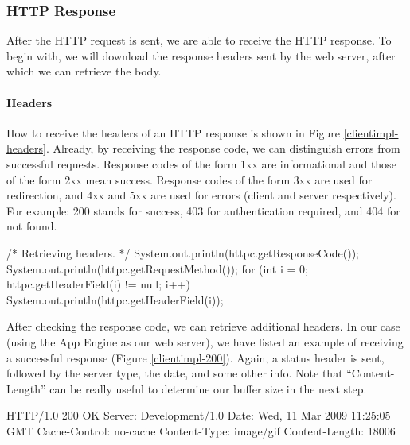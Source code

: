 \subsubsection{HTTP Response}
After the HTTP request is sent, we are able to receive the HTTP response. To
begin with, we will download the response headers sent by the web server, after
which we can retrieve the body.

\paragraph{Headers}
How to receive the headers of an HTTP response is shown in Figure
\ref{clientimpl-headers}. Already, by receiving the response code, we can
distinguish errors from successful requests. Response codes of the form 1xx
are informational and those of the form 2xx mean success. Response codes
of the form 3xx are used for redirection, and 4xx and 5xx are used for
errors (client and server respectively). For example: 200 stands for success, 403 for
authentication required, and 404 for not found.

\begin{figure*}[ht] %
\begin{center}
\begin{code}
/* Retrieving headers. */
System.out.println(httpc.getResponseCode());
System.out.println(httpc.getRequestMethod());
for (int i = 0; httpc.getHeaderField(i) != null; i++) {
    System.out.println(httpc.getHeaderField(i));
}
\end{code}
\caption{Retrieving HTTP response headers.\label{clientimpl-headers}}
\end{center}
\end{figure*}

After checking the response code, we can retrieve additional headers. In our case
(using the App Engine as our web server), we have listed an example of receiving
a successful response (Figure \ref{clientimpl-200}). Again, a status header is
sent, followed by the server type, the date, and some other info. Note that
``Content-Length'' can be really useful to determine our buffer size in the next
step.

\begin{figure*}[ht] %
\begin{center}
\begin{code}
HTTP/1.0 200 OK
Server: Development/1.0
Date: Wed, 11 Mar 2009 11:25:05 GMT
Cache-Control: no-cache
Content-Type: image/gif
Content-Length: 18006
\end{code}
\caption{Example of HTTP response headers.\label{clientimpl-200}}
\end{center}
\end{figure*}

